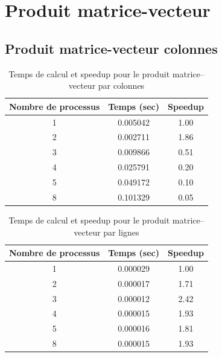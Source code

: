 \documentclass[a4paper,13pt]{book}
\begin{document}
\section{Produit matrice-vecteur}
\subsection{Produit matrice-vecteur colonnes}

\begin{table}[ht]
  \centering
  \caption{Temps de calcul et speedup pour le produit matrice--vecteur par colonnes}
  \begin{tabular}{@{}ccc@{}}
    \toprule
    Nombre de processus & Temps (sec) & Speedup \\ \midrule
    1 & 0.005042 & 1.00 \\
    2 & 0.002711 & 1.86 \\
    3 & 0.009866 & 0.51 \\
    4 & 0.025791 & 0.20 \\
    5 & 0.049172 & 0.10 \\
    8 & 0.101329 & 0.05 \\ \bottomrule
  \end{tabular}
  \label{tab:col}
\end{table}

\begin{table}[ht]
  \centering
  \caption{Temps de calcul et speedup pour le produit matrice--vecteur par lignes}
  \begin{tabular}{@{}ccc@{}}
    \toprule
    Nombre de processus & Temps (sec) & Speedup \\ \midrule
    1 & 0.000029 & 1.00 \\
    2 & 0.000017 & 1.71 \\
    3 & 0.000012 & 2.42 \\
    4 & 0.000015 & 1.93 \\
    5 & 0.000016 & 1.81 \\
    8 & 0.000015 & 1.93 \\ \bottomrule
  \end{tabular}
  \label{tab:row}
\end{table}

\pgfplotsset{compat=1.18}
\end{document}
